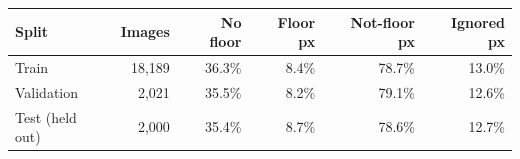 \begin{tabular}{lrrrrr}
\toprule
Split & Images & No floor & Floor px & Not-floor px & Ignored px \\
\midrule
Train & 18,189 & 36.3\% & 8.4\% & 78.7\% & 13.0\% \\
Validation & 2,021 & 35.5\% & 8.2\% & 79.1\% & 12.6\% \\
Test (held out) & 2,000 & 35.4\% & 8.7\% & 78.6\% & 12.7\% \\
\bottomrule
\end{tabular}
